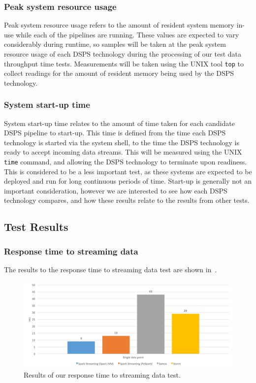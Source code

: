 \subsubsection{Peak system resource usage}

Peak system resource usage refers to the amount of resident system memory in-use while each of the pipelines are running.
These values are expected to vary considerably during runtime, so samples will be taken at the peak system resource usage of each DSPS
technology during the processing of our test data throughput time tests.
Measurements will be taken using the UNIX tool \texttt{top} to collect readings for the amount of resident memory being used
by the DSPS technology.

\subsubsection{System start-up time}

System start-up time relates to the amount of time taken for each candidate DSPS pipeline to start-up. This time is
defined from the time each DSPS technology is started via the system shell, to the time the DSPS technology is
ready to accept incoming data streams. This will be measured using the UNIX \texttt{time} command, and allowing the
DSPS technology to terminate upon readiness. This is considered to be a less important test, as these systems are expected
to be deployed and run for long continuous periods of time. Start-up is generally not an important consideration, however
we are interested to see how each DSPS technology compares, and how these results relate to the results from other tests.



\subsection{Test Results} %
\label{sub:test_results}

\subsubsection{Response time to streaming data}

The results to the response time to streaming data test are shown in~.

\begin{figure}[ht]
  \centering
  \includegraphics[width=1\textwidth]{includes/figures/fig_response_time_res}
  \caption{Results of our response time to streaming data test.}
  \label{fig:response_time_res}
\end{figure}

